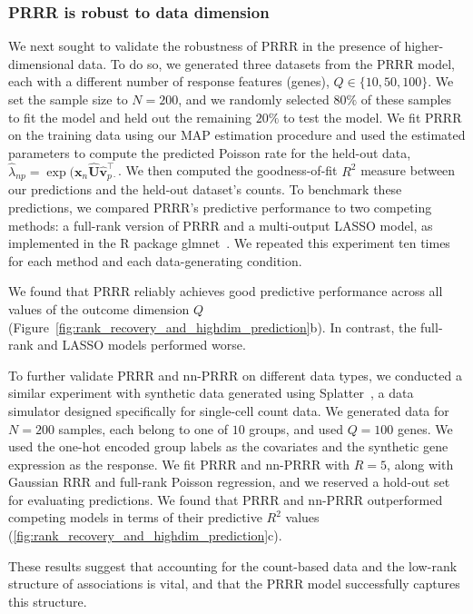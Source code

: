 \documentclass{bmcart}
\begin{document}
\subsubsection*{PRRR is robust to data dimension}
We next sought to validate the robustness of PRRR in the presence of higher-dimensional data. To do so, we generated three datasets from the PRRR model, each with a different number of response features (genes), $Q \in \{10, 50, 100\}$. We set the sample size to $N = 200$, and we randomly selected $80\%$ of these samples to fit the model and held out the remaining $20\%$ to test the model.
We fit PRRR on the training data using our MAP estimation procedure and used the estimated parameters to compute the predicted Poisson rate for the held-out data, $\widehat{\lambda}_{np} = \exp(\mathbf{x}_n \widehat{\mathbf{U}}\widehat{\mathbf{v}}_{p\cdot}^\top$. We then computed the goodness-of-fit $R^2$ measure between our predictions and the held-out dataset's counts. To benchmark these predictions, we compared PRRR's predictive performance to two competing methods: a full-rank version of PRRR and a multi-output LASSO model, as implemented in the R package glmnet~\citep{friedman2010note}. We repeated this experiment ten times for each method and each data-generating condition.

We found that PRRR reliably achieves good predictive performance across all values of the outcome dimension $Q$ (Figure~\ref{fig:rank_recovery_and_highdim_prediction}b). In contrast, the full-rank and LASSO models performed worse. 

To further validate PRRR and nn-PRRR on different data types, we conducted a similar experiment with synthetic data generated using Splatter~\citep{zappia2017splatter}, a data simulator designed specifically for single-cell count data. We generated data for $N=200$ samples, each belong to one of $10$ groups, and used $Q=100$ genes. We used the one-hot encoded group labels as the covariates and the synthetic gene expression as the response. We fit PRRR and nn-PRRR with $R=5$, along with Gaussian RRR and full-rank Poisson regression, and we reserved a hold-out set for evaluating predictions. We found that PRRR and nn-PRRR outperformed competing models in terms of their predictive $R^2$ values (\autoref{fig:rank_recovery_and_highdim_prediction}c).

These results suggest that accounting for the count-based data and the low-rank structure of associations is vital, and that the PRRR model successfully captures this structure. 
\end{document}
